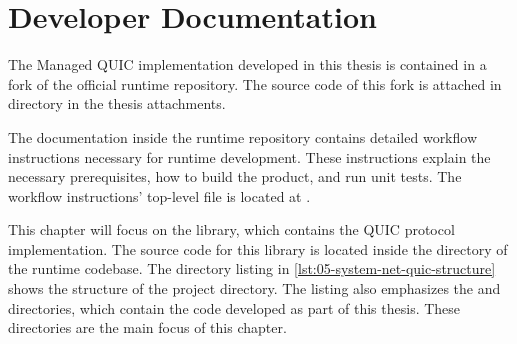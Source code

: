 \chapter{Developer Documentation}

The Managed QUIC implementation developed in this thesis is contained in a fork of the official
\dotnet{} runtime repository. The source code of this fork is attached in
 directory in the thesis attachments.

The documentation inside the \dotnet{} runtime repository contains detailed workflow instructions
necessary for \dotnet{} runtime development. These instructions explain the necessary prerequisites,
how to build the product, and run unit tests. The workflow instructions' top-level file is located
at .

This chapter will focus on the  library, which contains the QUIC protocol
implementation. The source code for this library is located inside the
 directory of the \dotnet{} runtime
codebase. The directory listing in \autoref{lst:05-system-net-quic-structure} shows the structure of
the  project directory. The listing also emphasizes the 
and  directories, which contain the code developed as part of this thesis. These
directories are the main focus of this chapter.

\newcommand{\mydtcomment}[1]{\DTcomment{#1}}
\DTsetlength{0.2em}{0.6em}{0.2em}{0.4pt}{1.6pt}
\renewcommand{\DTstylecomment}[1]{{\footnotesize\rmfamily #1}}
\renewcommand{\DTstyle}[1]{{\footnotesize\texttt{#1}}}
\newcommand{\dtemph}[1]{\textcolor{dtemphcolor}{\emph{#1}}}

